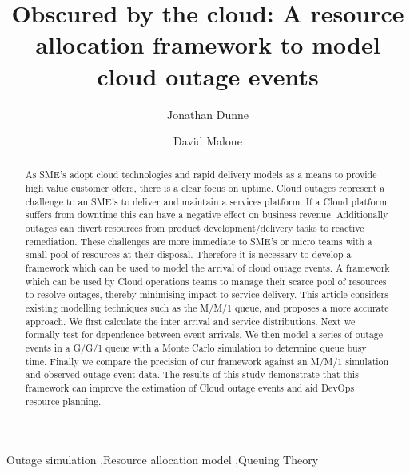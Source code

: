 \documentclass[5p]{elsarticle}
\begin{document}
\begin{frontmatter}

\title{Obscured by the cloud: A resource allocation framework to model cloud outage events}


\author[mymainaddress]{Jonathan Dunne}

\author[mymainaddress]{David Malone}

\address[mymainaddress]{Hamilton Institute, Maynooth University, Kildare, Ireland}

\begin{abstract}
As SME's adopt cloud technologies and rapid delivery models as a means to provide high value customer offers, there is a clear focus on uptime. Cloud outages represent a challenge to an SME's to deliver and maintain a services platform. If a Cloud platform suffers from downtime this can have a negative effect on business revenue. Additionally outages can divert resources from product development/delivery tasks to reactive remediation. These challenges are more immediate to SME's or micro teams with a small pool of resources at their disposal. Therefore it is necessary to develop a framework which can be used to model the arrival of cloud outage events. A framework which can be used by Cloud operations teams to manage their scarce pool of resources to resolve outages, thereby minimising impact to service delivery. This article considers existing modelling techniques such as the M/M/1 queue, and proposes a more accurate approach. We first calculate the inter arrival and service distributions. Next we formally test for dependence between event arrivals. We then model a series of outage events in a G/G/1 queue with a Monte Carlo simulation to determine queue busy time.  Finally we compare the precision of our framework against an M/M/1 simulation and observed outage event data. The results of this study demonstrate that this framework can improve the estimation of Cloud outage events and aid DevOps resource planning.
\end{abstract}

\begin{keyword}
Outage simulation \sep Resource allocation model \sep Queuing Theory 
\end{keyword}

\end{frontmatter}
\end{document}
